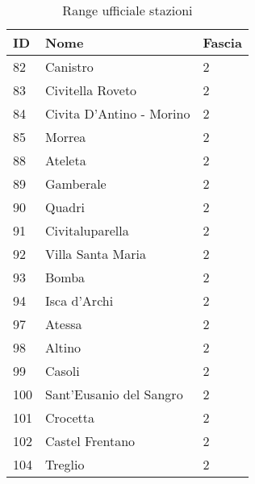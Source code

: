 \begin{table}[t]
\centering
\caption{Range ufficiale stazioni}
\label{my-label}
\begin{tabular}{|p{1cm}|p{4cm}|p{2cm}|}
\hline
\rowcolor[HTML]{C0C0C0} 
ID  & Nome                                     & Fascia \\ \hline
\rowcolor[HTML]{FFFE65} 
82  & Canistro                                 & 2      \\ \hline
\rowcolor[HTML]{FFFE65} 
83  & Civitella Roveto                         & 2      \\ \hline
\rowcolor[HTML]{FFFE65} 
84  & Civita D'Antino - Morino                 & 2      \\ \hline
\rowcolor[HTML]{FFFE65} 
85  & Morrea                                   & 2      \\ \hline
\rowcolor[HTML]{FFFE65} 
88  & Ateleta                                  & 2      \\ \hline
\rowcolor[HTML]{FFFE65} 
89  & Gamberale                                & 2      \\ \hline
\rowcolor[HTML]{FFFE65} 
90  & Quadri                                   & 2      \\ \hline
\rowcolor[HTML]{FFFE65} 
91  & Civitaluparella                          & 2      \\ \hline
\rowcolor[HTML]{FFFE65} 
92  & Villa Santa Maria                        & 2      \\ \hline
\rowcolor[HTML]{FFFE65} 
93  & Bomba                                    & 2      \\ \hline
\rowcolor[HTML]{FFFE65} 
94  & Isca d'Archi                             & 2      \\ \hline
\rowcolor[HTML]{FFFE65} 
97  & Atessa                                   & 2      \\ \hline
\rowcolor[HTML]{FFFE65} 
98  & Altino                                   & 2      \\ \hline
\rowcolor[HTML]{FFFE65} 
99  & Casoli                                   & 2      \\ \hline
\rowcolor[HTML]{FFFE65} 
100 & Sant'Eusanio del Sangro                  & 2      \\ \hline
\rowcolor[HTML]{FFFE65} 
101 & Crocetta                                 & 2      \\ \hline
\rowcolor[HTML]{FFFE65} 
102 & Castel Frentano                          & 2      \\ \hline
\rowcolor[HTML]{FFFE65} 
104 & Treglio                                  & 2      \\ \hline

\end{tabular}
\end{table}
